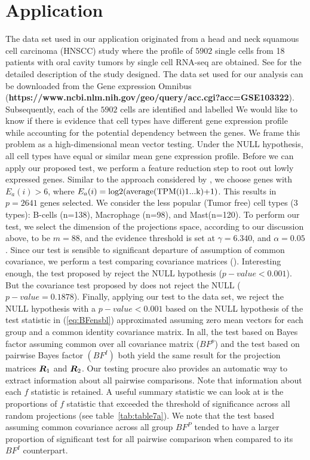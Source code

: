 \documentclass[12pt]{article}
\def\log{\hbox{log}}
\def\log{\hbox{log}}
\newcommand{\uR}       {\mbox{\boldmath$R$}}
\begin{document}
\section{Application} \label{sec:Application}
The data set used in our application originated from a head and neck squamous cell carcinoma (HNSCC) study where the profile of $5902$ single cells from 18 patients with oral cavity tumors by single cell RNA-seq are obtained. See \citep{puram2017single} for the detailed description of the study designed. The data set used for our analysis can be downloaded from the Gene expression Omnibus (\textbf{https://www.ncbi.nlm.nih.gov/geo/query/acc.cgi?acc=GSE103322}). Subsequently, each of the $5902$ cells are identified and labelled %
We would like to know if there is evidence that cell types have different gene expression profile while accounting for the potential dependency between the genes. We frame this problem as a high-dimensional mean vector testing. Under the NULL hypothesis, all cell types have equal or similar mean gene expression profile. Before we can apply our proposed test, we perform a feature reduction step to root out lowly expressed genes. Similar to the approach considered by \cite{puram2017single}, we choose genes with $E_a(i) > 6$, where $E_a(i)=\log2\text{(average(TPM(i)1...k)+1)}$. This results in $p = 2641$ genes selected. We consider the less popular (Tumor free) cell types (3 types): B-cells (n=138),  Macrophage (n=98), and Mast(n=120). To perform our test, we select the dimension of the projections space, according to our discussion above, to be $m = 88$, and the evidence threshold is set at $\gamma = 6.340$, and $\alpha = 0.05$. Since our test is sensible to significant departure of assumption of common covariance, we perform a test comparing covariance matrices (\citealp{ahmad2017location,srivastava2010testing}). Interesting enough, the test proposed by \citealt{ahmad2017location} reject the NULL hypothesis ($p-value < 0.001$). But the covariance test proposed by \cite{srivastava2010testing} does not reject the NULL ($p-value = 0.1878$). 
Finally, applying our test to the data set, we reject the NULL hypothesis with a $p-value < 0.001$ based on the NULL hypothesis of the test statistic in (\ref{eq:BFensbl}) approximated assuming zero mean vectors for each group and a common identity covariance matrix. In all, the test based on Bayes factor assuming common over all covariance matrix ($BF^{p}$) and the test based on pairwise Bayes factor $(BF^{I})$ both yield the same result for the projection matrices $\uR_1$ and $\uR_2$. 
Our testing procure also provides an automatic way to extract information about all pairwise comparisons. Note that information about each $f$ statistic is retained. A useful summary statistic we can look at is the proportions of $f$ statistic that exceeded the threshold of significance across all random projections (see table~\ref{tab:table7a}). We note that the test based assuming common covariance across all group $BF^{P}$ tended to have a larger proportion of significant test for all pairwise comparison when compared to its $BF^{I}$ counterpart.  
\end{document}
